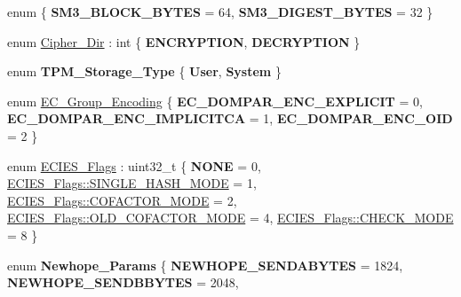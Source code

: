 \begin{DoxyCompactItemize}
\mbox{\label{namespace_botan_a00c9c4f3dbf31294f0a3b36f82e9d5c0}} 
enum \{ {\bfseries S\+M3\+\_\+\+B\+L\+O\+C\+K\+\_\+\+B\+Y\+T\+ES} = 64, 
{\bfseries S\+M3\+\_\+\+D\+I\+G\+E\+S\+T\+\_\+\+B\+Y\+T\+ES} = 32
 \}
\item 
enum \mbox{\hyperlink{namespace_botan_a8d9547a8fb3e868810b169b20ac389ee}{Cipher\+\_\+\+Dir}} \+: int \{ {\bfseries E\+N\+C\+R\+Y\+P\+T\+I\+ON}, 
{\bfseries D\+E\+C\+R\+Y\+P\+T\+I\+ON}
 \}
\item 
\mbox{\label{namespace_botan_a1e8cdb2a8f5312e6ed667347b065e9ec}} 
enum {\bfseries T\+P\+M\+\_\+\+Storage\+\_\+\+Type} \{ {\bfseries User}, 
{\bfseries System}
 \}
\item 
enum \mbox{\hyperlink{namespace_botan_ad0ee6307c8f311388a2bc00426a7f858}{E\+C\+\_\+\+Group\+\_\+\+Encoding}} \{ {\bfseries E\+C\+\_\+\+D\+O\+M\+P\+A\+R\+\_\+\+E\+N\+C\+\_\+\+E\+X\+P\+L\+I\+C\+IT} = 0, 
{\bfseries E\+C\+\_\+\+D\+O\+M\+P\+A\+R\+\_\+\+E\+N\+C\+\_\+\+I\+M\+P\+L\+I\+C\+I\+T\+CA} = 1, 
{\bfseries E\+C\+\_\+\+D\+O\+M\+P\+A\+R\+\_\+\+E\+N\+C\+\_\+\+O\+ID} = 2
 \}
\item 
enum \mbox{\hyperlink{namespace_botan_a9633493dccb5f879eeafafe99c71f6e8}{E\+C\+I\+E\+S\+\_\+\+Flags}} \+: uint32\+\_\+t \{ \newline
{\bfseries N\+O\+NE} = 0, 
\mbox{\hyperlink{namespace_botan_a9633493dccb5f879eeafafe99c71f6e8a8f077adf8e11b076e88eee680527f81e}{E\+C\+I\+E\+S\+\_\+\+Flags\+::\+S\+I\+N\+G\+L\+E\+\_\+\+H\+A\+S\+H\+\_\+\+M\+O\+DE}} = 1, 
\mbox{\hyperlink{namespace_botan_a9633493dccb5f879eeafafe99c71f6e8a421ba92bce979a3ec3aafaa74a7103d7}{E\+C\+I\+E\+S\+\_\+\+Flags\+::\+C\+O\+F\+A\+C\+T\+O\+R\+\_\+\+M\+O\+DE}} = 2, 
\mbox{\hyperlink{namespace_botan_a9633493dccb5f879eeafafe99c71f6e8a2165f0ab80715b5218d379471e4f59cb}{E\+C\+I\+E\+S\+\_\+\+Flags\+::\+O\+L\+D\+\_\+\+C\+O\+F\+A\+C\+T\+O\+R\+\_\+\+M\+O\+DE}} = 4, 
\newline
\mbox{\hyperlink{namespace_botan_a9633493dccb5f879eeafafe99c71f6e8a2376233bf1de21598ca22c5143aea223}{E\+C\+I\+E\+S\+\_\+\+Flags\+::\+C\+H\+E\+C\+K\+\_\+\+M\+O\+DE}} = 8
 \}
\item 
\mbox{\label{namespace_botan_a6afe4e4b818b57d67f00ee387c06721c}} 
enum {\bfseries Newhope\+\_\+\+Params} \{ \newline
{\bfseries N\+E\+W\+H\+O\+P\+E\+\_\+\+S\+E\+N\+D\+A\+B\+Y\+T\+ES} = 1824, 
{\bfseries N\+E\+W\+H\+O\+P\+E\+\_\+\+S\+E\+N\+D\+B\+B\+Y\+T\+ES} = 2048, 

\end{DoxyCompactItemize}
